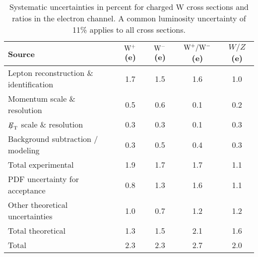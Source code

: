 \begin{table}
   \caption[.]{ \label{tab:systEL}
Systematic uncertainties in percent for charged W cross sections and ratios in the
electron channel.
A common luminosity uncertainty of 11\% applies to all cross sections. }
\begin{center}
\begin {tabular} {|l|c|c|c|c|}
\hline
Source       & $\mathrm{W^+}$ (e) & $\mathrm{W^-}$ (e) & $\mathrm{W^+}/\mathrm{W^-}$ (e) & $W/Z$ (e) \\
         \hline
Lepton reconstruction \& identification  & 1.7 & 1.5 & 1.6 & 1.0 \\
Momentum scale \& resolution             & 0.5 & 0.6 & 0.1 & 0.2 \\
${E\!\!\!/}_{\mathrm{T}}$ scale \& resolution               & 0.3 & 0.3 & 0.1 & 0.3 \\
Background subtraction / modeling        & 0.3 & 0.5 & 0.4 & 0.3 \\
\hline
Total experimental                       & 1.9 & 1.7 & 1.7 & 1.1 \\
\hline
PDF uncertainty for acceptance           & 0.8 & 1.3 & 1.6 & 1.1 \\
Other theoretical uncertainties          & 1.0 & 0.7 & 1.2 & 1.2 \\
\hline
Total theoretical                        & 1.3 & 1.5 & 2.1 & 1.6 \\
\hline
Total                                    & 2.3 & 2.3 & 2.7 & 2.0 \\
\hline
\end {tabular}
\end{center}
\end{table}
